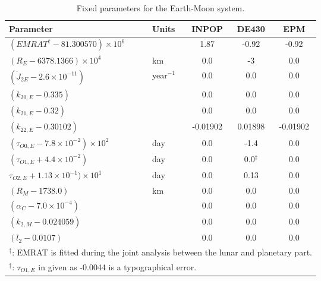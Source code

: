 \documentclass[fleqn,usenatbib,referee]{mnras}
\begin{document}
 \begin{table*}
    \label{fixed_param}
    \caption{Fixed parameters for the Earth-Moon system.}
    \begin{tabular}{llccc}
    \hline
   \textbf{Parameter}                                             & \textbf{Units}  & \textbf{INPOP}  & \textbf{DE430}  & \textbf{EPM}  \\ \midrule
           $(EMRAT^{\dag} - 81.300570)\times 10^{6}$              &                 & 1.87          & -0.92              & -0.92            \\ 
           $(R_E    -   6378.1366) \times 10^{4}$                 & km              & 0.0           & -3              & 0.0           \\          
           $(\dot{J}_{2E} -2.6\times 10^{-11}) $                  & year$^{-1}$     & 0.0           & 0.0             & 0.0           \\ 
           $(k_{20,E} - 0.335)$                                   &                 & 0.0           & 0.0             & 0.0           \\ 
           $(k_{21,E} - 0.32)$                                    &                 & 0.0           & 0.0             & 0.0           \\ 
           $(k_{22,E} - 0.30102)$                                 &                 & -0.01902      & 0.01898         & -0.01902      \\ 
           $(\tau_{O0,E} - 7.8\times 10^{-2}) \times 10^{2} $     & day             & 0.0           & -1.4            & 0.0           \\ 
           $(\tau_{O1,E} +4.4\times 10^{-2}) $                    & day             & 0.0           & 0.0$^{\ddag}$   & 0.0           \\ 
           $\tau_{O2,E} +1.13\times 10^{-1})\times 10^{1}  $      & day             & 0.0           & 0.13            & 0.0           \\ 
           $(R_M - 1738.0)$                                       & km              & 0.0           & 0.0             & 0.0           \\          
           $(\alpha_{C} - 7.0\times 10^{-4}) $                    &                 & 0.0           & 0.0             & 0.0           \\ 
           $ (k_{2,M} -0.024059)$                                 &                 & 0.0           & 0.0             & 0.0           \\ 
           $ (l_{2} - 0.0107)$                                    &                 & 0.0           & 0.0             & 0.0           \\ 
           \hline
           \multicolumn{5}{l}{$^\dag$: EMRAT is fitted during the joint analysis between the lunar and planetary part.} \\
           \multicolumn{5}{l}{$^\ddag$: $\tau_{O1,E}$ in \cite{Folkner2014} given as -0.0044 is a typographical error.}
    \end{tabular}
   \end{table*}
\end{document}

